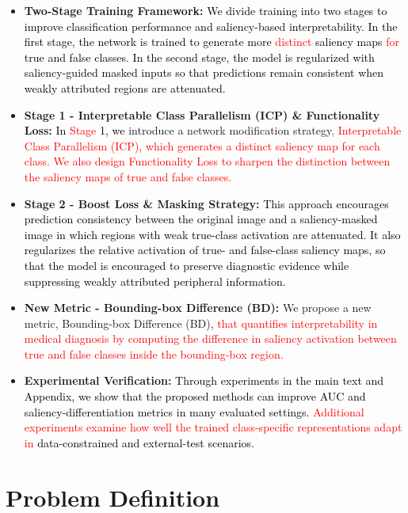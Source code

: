 \documentclass[preprint,7pt, a4paper]{elsarticle}
\begin{document}
\begin{itemize}
\item \textbf{Two-Stage Training Framework:} \textcolor{black}{We divide training into two stages to improve classification performance and saliency-based interpretability. In the first stage, the network is trained to generate more \textcolor{red}{distinct} saliency maps \textcolor{red}{for} true and false classes. In the second stage, the model is regularized with saliency-guided masked inputs so that predictions remain consistent when weakly attributed regions are attenuated.}
\item \textbf{Stage 1 - Interpretable Class Parallelism (ICP) \& Functionality Loss:} \textcolor{black}{In \textcolor{red}{Stage} 1, we} introduce a network modification strategy\textcolor{red}{, Interpretable Class Parallelism (ICP), which generates a distinct saliency map for each class. We also design Functionality Loss to sharpen the distinction between the saliency maps of true and false classes.}
\item \textbf{Stage 2 - Boost Loss \& Masking Strategy:} \textcolor{black}{This approach encourages prediction consistency between the original image and a saliency-masked image in which regions with weak true-class activation are attenuated. It also regularizes the relative activation of true- and false-class saliency maps, so that the model is encouraged to preserve diagnostic evidence while suppressing weakly attributed peripheral information.}
\item \textbf{New Metric - Bounding-box Difference (BD):} We propose a new metric, Bounding-box Difference (BD), \textcolor{red}{that quantifies interpretability in medical diagnosis} \textcolor{black}{\textcolor{red}{by computing the difference in saliency activation between true and false classes inside the bounding-box region.}}
\item \textbf{Experimental Verification: } \textcolor{black}{Through experiments in the main text and Appendix, we show that the proposed methods can improve AUC and saliency-differentiation metrics in many evaluated settings. \textcolor{red}{Additional experiments examine how well the trained class-specific representations adapt in} data-constrained and external-test scenarios.}
\end{itemize}

\section{Problem Definition}
\end{document}
